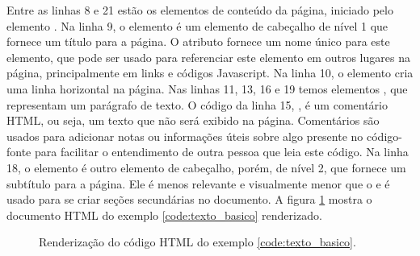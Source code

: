 Entre as linhas 8 e 21 estão os elementos de conteúdo da página, iniciado pelo elemento . Na linha 9, o elemento  é um elemento de cabeçalho de nível 1 que fornece um título para a página. O atributo  fornece um nome único para este elemento, que pode ser usado para referenciar este elemento em outros lugares na página, principalmente em links e códigos Javascript. Na linha 10, o elemento  cria uma linha horizontal na página. Nas linhas 11, 13, 16 e 19 temos elementos , que representam um parágrafo de texto. O código da linha 15, , é um comentário HTML, ou seja, um texto que não será exibido na página. Comentários são usados para adicionar notas ou informações úteis sobre algo presente no código-fonte para facilitar o entendimento de outra pessoa que leia este código. Na linha 18, o elemento  é outro elemento de cabeçalho, porém, de nível 2, que fornece um subtítulo para a página. Ele é menos relevante e visualmente menor que o  e é usado para se criar seções secundárias no documento. A figura \ref{fig:rend_html_basico} mostra o documento HTML do exemplo \ref{code:texto_basico} renderizado.

\begin{figure}[ht!]
    \centering
    \caption{Renderização do código HTML do exemplo \ref{code:texto_basico}.}
    \label{fig:rend_html_basico}
\end{figure}


